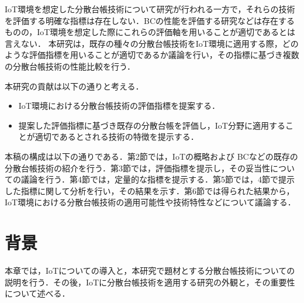 \documentclass{kuisthesis}			%
\begin{document}
IoT環境を想定した分散台帳技術について研究が行われる一方で，それらの技術を評価する明確な指標は存在しない．BCの性能を評価する研究\cite{croman2016scaling}などは存在するものの，IoT環境を想定した際にこれらの評価軸を用いることが適切であるとは言えない．
本研究は，既存の種々の分散台帳技術をIoT環境に適用する際，どのような評価指標を用いることが適切であるか議論を行い，その指標に基づき複数の分散台帳技術の性能比較を行う．

本研究の貢献は以下の通りと考える．
\begin{itemize}
\setlength{\itemsep}{0cm}
\item IoT環境における分散台帳技術の評価指標を提案する．
\item 提案した評価指標に基づき既存の分散台帳を評価し，IoT分野に適用することが適切であるとされる技術の特徴を提示する．
\end{itemize}

本稿の構成は以下の通りである．第2節では，IoTの概略および BCなどの既存の分散台帳技術の紹介を行う．第3節では，評価指標を提示し，その妥当性についての議論を行う．第4節では，定量的な指標を提示する．第5節では，4節で提示した指標に関して分析を行い，その結果を示す．第6節では得られた結果から，IoT環境における分散台帳技術の適用可能性や技術特性などについて議論する．

\section{背景}
本章では，IoTについての導入と，本研究で題材とする分散台帳技術についての説明を行う．その後，IoTに分散台帳技術を適用する研究の外観と，その重要性について述べる．
\end{document}
